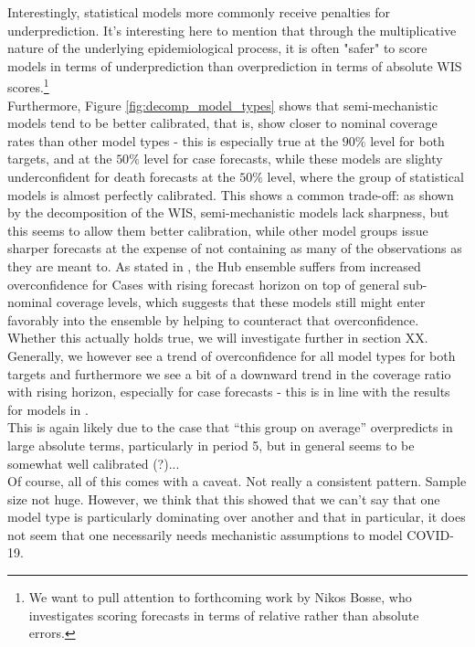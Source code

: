 Interestingly, statistical models more commonly receive penalties for underprediction. It's interesting here to mention that through the multiplicative nature of the underlying epidemiological process, it is often "safer" to score models in terms of underprediction than overprediction in terms of absolute WIS scores.\footnote{We want to pull attention to forthcoming work by Nikos Bosse, who investigates scoring forecasts in terms of relative rather than absolute errors.}  \\
Furthermore, Figure \ref{fig:decomp_model_types} shows that semi-mechanistic models tend to be better calibrated, that is, show closer to nominal coverage rates than other model types - this is especially true at the $90\%$ level for both targets, and at the $50\%$ level for case forecasts, while these models are slighty underconfident for death forecasts at the $50\%$ level, where the group of statistical models is almost perfectly calibrated. This shows a common trade-off: as shown by the decomposition of the WIS, semi-mechanistic models lack sharpness, but this seems to allow them better calibration, while other model groups issue sharper forecasts at the expense of not containing as many of the observations as they are meant to. As stated in \cite{sherratt_european_2022}, the Hub ensemble suffers from increased overconfidence for Cases with rising forecast horizon on top of general sub-nominal coverage levels, which suggests that these models still might enter favorably into the ensemble by helping to counteract that overconfidence. Whether this actually holds true, we will investigate further in section XX. Generally, we however see a trend of overconfidence for all model types for both targets and furthermore we see a bit of a downward trend in the coverage ratio with rising horizon, especially for case forecasts - this is in line with the results for models in \cite{sherratt_european_2022}. \\
This is again likely due to the case that ``this group on average'' overpredicts in large absolute terms, particularly in period 5, but in general seems to be somewhat well calibrated (?)...\\
Of course, all of this comes with a caveat. Not really a consistent pattern. Sample size not huge. However, we think that this showed that we can't say that one model type is particularly dominating over another and that in particular, it does not seem that one necessarily needs mechanistic assumptions to model COVID-19.\\
